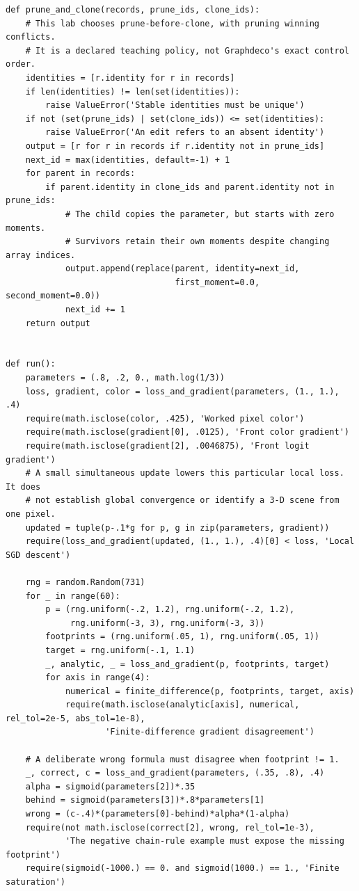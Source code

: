 \begin{verbatim}
def prune_and_clone(records, prune_ids, clone_ids):
    # This lab chooses prune-before-clone, with pruning winning conflicts.
    # It is a declared teaching policy, not Graphdeco's exact control order.
    identities = [r.identity for r in records]
    if len(identities) != len(set(identities)):
        raise ValueError('Stable identities must be unique')
    if not (set(prune_ids) | set(clone_ids)) <= set(identities):
        raise ValueError('An edit refers to an absent identity')
    output = [r for r in records if r.identity not in prune_ids]
    next_id = max(identities, default=-1) + 1
    for parent in records:
        if parent.identity in clone_ids and parent.identity not in prune_ids:
            # The child copies the parameter, but starts with zero moments.
            # Survivors retain their own moments despite changing array indices.
            output.append(replace(parent, identity=next_id,
                                  first_moment=0.0, second_moment=0.0))
            next_id += 1
    return output


def run():
    parameters = (.8, .2, 0., math.log(1/3))
    loss, gradient, color = loss_and_gradient(parameters, (1., 1.), .4)
    require(math.isclose(color, .425), 'Worked pixel color')
    require(math.isclose(gradient[0], .0125), 'Front color gradient')
    require(math.isclose(gradient[2], .0046875), 'Front logit gradient')
    # A small simultaneous update lowers this particular local loss. It does
    # not establish global convergence or identify a 3-D scene from one pixel.
    updated = tuple(p-.1*g for p, g in zip(parameters, gradient))
    require(loss_and_gradient(updated, (1., 1.), .4)[0] < loss, 'Local SGD descent')

    rng = random.Random(731)
    for _ in range(60):
        p = (rng.uniform(-.2, 1.2), rng.uniform(-.2, 1.2),
             rng.uniform(-3, 3), rng.uniform(-3, 3))
        footprints = (rng.uniform(.05, 1), rng.uniform(.05, 1))
        target = rng.uniform(-.1, 1.1)
        _, analytic, _ = loss_and_gradient(p, footprints, target)
        for axis in range(4):
            numerical = finite_difference(p, footprints, target, axis)
            require(math.isclose(analytic[axis], numerical, rel_tol=2e-5, abs_tol=1e-8),
                    'Finite-difference gradient disagreement')

    # A deliberate wrong formula must disagree when footprint != 1.
    _, correct, c = loss_and_gradient(parameters, (.35, .8), .4)
    alpha = sigmoid(parameters[2])*.35
    behind = sigmoid(parameters[3])*.8*parameters[1]
    wrong = (c-.4)*(parameters[0]-behind)*alpha*(1-alpha)
    require(not math.isclose(correct[2], wrong, rel_tol=1e-3),
            'The negative chain-rule example must expose the missing footprint')
    require(sigmoid(-1000.) == 0. and sigmoid(1000.) == 1., 'Finite saturation')


\end{verbatim}
